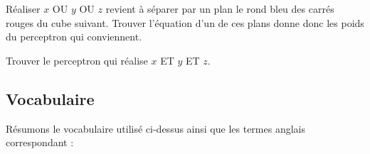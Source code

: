 \documentclass[11pt,class=report,crop=false]{standalone}
\begin{document}
\begin{exemple}
Réaliser \og{}$x$ OU $y$ OU $z$\fg{} revient à séparer par un plan le rond bleu des carrés rouges du cube suivant. Trouver l'équation d'un de ces plans donne donc les poids du perceptron qui conviennent. 

\begin{center}
\begin{minipage}{0.60\textwidth}
\end{minipage}
\begin{minipage}{0.39\textwidth}
\end{minipage}
\end{center}

\end{exemple}

\begin{exercicecours}
Trouver le perceptron qui réalise  \og{}$x$ ET $y$ ET $z$\fg{}.

\end{exercicecours}




\subsection{Vocabulaire}

Résumons le vocabulaire utilisé ci-dessus ainsi que les termes anglais correspondant :
\end{document}
